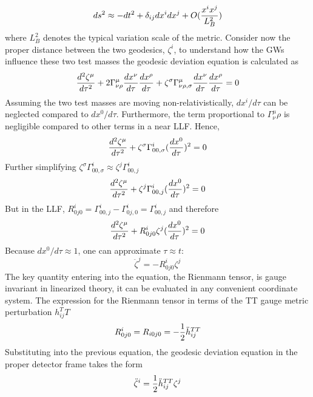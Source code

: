 \documentclass[binding=0.6cm, LaM]{sapthesis}
\begin{document}
\begin{equation}
ds^2 \approx -dt^2 + \delta_{ij}dx^i dx^j + O({{x^ix^j}\over{L^2_B}})
\end{equation}
where $L^2_B$ denotes the typical variation scale of the metric.
Consider now the proper distance between the two geodesics, $\zeta^i$, to understand how the GWs influence these two test masses the geodesic deviation equation is calculated as 
\begin{equation}
{{d^2\zeta^{\mu}}\over{d\tau^2}} + 2\Gamma^{\mu}_{\nu\rho}{{dx^{\nu}}\over{d\tau}}{{dx^\rho}\over{d\tau}} + \zeta^{\sigma}\Gamma^{\mu}_{\nu\rho,\sigma}{{dx^{\nu}}\over{d\tau}}{{dx^{\rho}}\over{d\tau}} = 0
\end{equation}
Assuming the two test masses are moving non-relativistically, $dx^i/d\tau$ can be neglected compared to $dx^0/d\tau$. Furthermore, the term proportional to $\Gamma^{\mu}_\nu\rho{}$ is negligible compared to other terms in a near LLF. Hence,
\begin{equation}
{{d^2\zeta^{\mu}}\over{d\tau^2}} + \zeta^{\sigma}\Gamma^{i}_{00, \sigma}({{dx^0}\over{d\tau}})^2 = 0
\end{equation}
Further simplifying $\zeta^{\sigma}\Gamma^{i}_{00, \sigma} \approx \zeta^{j}\Gamma^{i}_{00, j}$
\begin{equation}
{{d^2\zeta^{\mu}}\over{d\tau^2}} + \zeta^{j}\Gamma^{i}_{00,j}({{dx^0}\over{d\tau}})^2 = 0
\end{equation}
But in the LLF, $R^i_{0j0} = \Gamma^i_{00,j} - \Gamma^i_{0j,0} = \Gamma^i_{00,j}$ and therefore
\begin{equation}
{{d^2\zeta^{\mu}}\over{d\tau^2}} + R^i_{0j0} \zeta^j({{dx^0}\over{d\tau}})^2 = 0
\end{equation}
Because $dx^0/d\tau \approx 1$, one can approximate $\tau \approx t$:
\begin{equation}
{\ddot \zeta}^j = - R^i_{0j0}\zeta^j
\end{equation}
The key quantity entering into the equation, the Rienmann tensor, is gauge invariant in linearized theory, it can be evaluated in any convenient coordinate system. The expression for the Rienmann tensor in terms of the TT gauge metric perturbation $h_{ij}^TT$
\begin{equation}
R^i_{0j0} = R_{i0j0} = - {1 \over 2}{\ddot h}_{ij}^{TT}
\end{equation}
Substituting into the previous equation, the geodesic deviation equation in the proper detector frame takes the form
\begin{equation}
{\ddot \zeta}^i = {1 \over 2}{\ddot h}_{ij}^{TT}\zeta^j
\end{equation}
\end{document}
